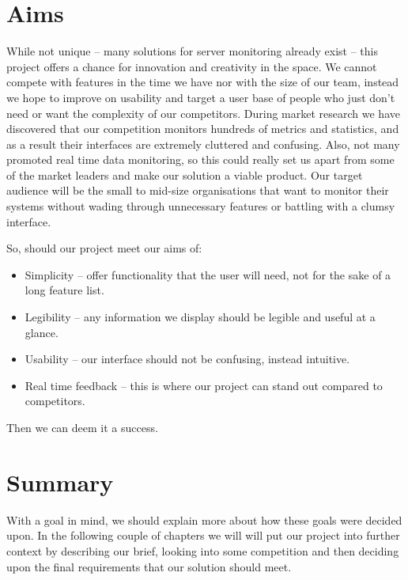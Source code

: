 \documentclass{l3proj}
\begin{document}

\section{Aims}
\label{aims}

While not unique -- many solutions for server monitoring already exist -- this project offers a chance for innovation and creativity in the space. We cannot compete with features in the time we have nor with the size of our team, instead we hope to improve on usability and target a user base of people who just don’t need or want the complexity of our competitors. During market research we have discovered that our competition monitors hundreds of metrics and statistics, and as a result their interfaces are extremely cluttered and confusing. Also, not many promoted real time data monitoring, so this could really set us apart from some of the market leaders and make our solution a viable product. Our target audience will be the small to mid-size organisations that want to monitor their systems without wading through unnecessary features or battling with a clumsy interface.

So, should our project meet our aims of:

\begin{itemize}
  \item Simplicity -- offer functionality that the user will need, not for the sake of a long feature list.
  \item Legibility -- any information we display should be legible and useful at a glance.
  \item Usability -- our interface should not be confusing, instead intuitive.
  \item Real time feedback -- this is where our project can stand out compared to competitors.
\end{itemize}

Then we can deem it a success.


\section{Summary}

With a goal in mind, we should explain more about how these goals were decided upon. In the following couple of chapters we will will put our project into further context by describing our brief, looking into some competition and then deciding upon the final requirements that our solution should meet.
\end{document}
